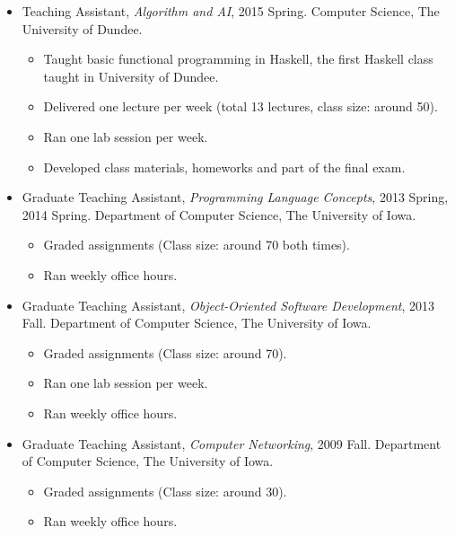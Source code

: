 \documentclass{article}
\begin{document}
\begin{itemize}

\item Teaching Assistant,  \textit{Algorithm and AI}, 2015 Spring.  Computer Science, The University of Dundee.
  \begin{itemize}
  \item Taught basic functional programming in Haskell, the first Haskell class taught in University of Dundee. 
  \item Delivered one lecture per week (total 13 lectures, class size: around 50). 
  \item Ran one lab session per week.  
  \item Developed class materials, homeworks and part of the final exam.  
  \end{itemize}
  
\item Graduate Teaching Assistant,  \textit{Programming Language Concepts}, 2013 Spring, 2014 Spring. Department of Computer Science, The University of Iowa.
  \begin{itemize}
  \item Graded assignments (Class size: around 70 both times).
  \item Ran weekly office hours. 
  \end{itemize}
  
\item Graduate Teaching Assistant,  \textit{Object-Oriented Software Development}, 2013 Fall. Department of Computer Science, The University of Iowa.
    \begin{itemize}
  \item Graded assignments (Class size: around 70).  
   \item Ran one lab session per week.  
  \item Ran weekly office hours. 
  \end{itemize}

  \item Graduate Teaching Assistant, \textit{Computer Networking}, 2009 Fall. Department of Computer Science, The University of Iowa.
      \begin{itemize}
  \item Graded assignments (Class size: around 30).
  \item Ran weekly office hours. 
    \end{itemize}

\end{itemize}
\end{document}
